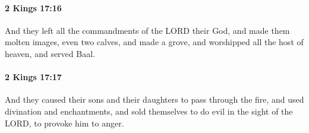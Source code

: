 		\paragraph{2 Kings 17:16} %
			\label{2KINGS-17-16}

			And they left all the commandments of the LORD their God, and made them molten images, even two calves, and made a grove, and worshipped all the host of heaven, and served Baal.


		\paragraph{2 Kings 17:17} %
			\label{2KINGS-17-17}

			And they caused their sons and their daughters to pass through the fire, and used divination and enchantments, and sold themselves to do evil in the sight of the LORD, to provoke him to anger.

